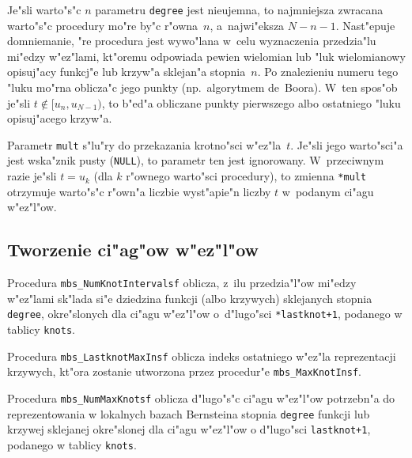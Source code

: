 Je"sli warto"s"c $n$ parametru \texttt{degree} jest nieujemna, to najmniejsza
zwracana warto"s"c procedury mo"re by"c r"owna~$n$, a~najwi"eksza $N-n-1$.
Nast"epuje domniemanie, "re procedura jest wywo"lana w~celu wyznaczenia
przedzia"lu mi"edzy w"ez"lami, kt"oremu odpowiada pewien wielomian lub "luk
wielomianowy opisuj"acy funkcj"e lub krzyw"a sklejan"a stopnia~$n$. Po
znalezieniu numeru tego "luku mo"rna oblicza"c jego punkty (np.\ algorytmem
de~Boora). W~ten spos"ob je"sli $t\notin[u_n,u_{N-1})$, to b"ed"a obliczane
punkty pierwszego albo ostatniego "luku opisuj"acego krzyw"a.

Parametr \texttt{mult} s"lu"ry do przekazania krotno"sci w"ez"la~$t$. Je"sli
jego warto"sci"a jest wska"znik pusty (\texttt{NULL}), to parametr ten jest
ignorowany. W~przeciwnym razie je"sli $t=u_k$ (dla $k$ r"ownego warto"sci
procedury), to zmienna \texttt{*mult} otrzymuje warto"s"c r"own"a liczbie
wyst"apie"n liczby $t$ w~podanym ci"agu w"ez"l"ow.



\subsection{Tworzenie ci"ag"ow w"ez"l"ow}

\hspace*{\parindent}Procedura \texttt{mbs\_NumKnotIntervalsf} oblicza,
z~ilu przedzia"l"ow mi"edzy
w"ez"lami sk"lada si"e dziedzina funkcji (albo krzywych) sklejanych stopnia
\texttt{degree}, okre"slonych dla ci"agu w"ez"l"ow o~d"lugo"sci
\texttt{*lastknot+1}, podanego w tablicy \texttt{knots}.


\vspace{\bigskipamount}
Procedura \texttt{mbs\_LastknotMaxInsf} oblicza indeks ostatniego w"ez"la
reprezentacji krzywych, kt"ora zostanie utworzona przez
procedur"e \texttt{mbs\_MaxKnotInsf}.

\vspace{\bigskipamount}
Procedura \texttt{mbs\_NumMaxKnotsf} oblicza d"lugo"s"c ci"agu w"ez"l"ow
potrzebn"a do reprezentowania w lokalnych bazach Bernsteina stopnia
\texttt{degree} funkcji lub krzywej sklejanej okre"slonej dla ci"agu
w"ez"l"ow o d"lugo"sci \texttt{lastknot+1}, podanego w tablicy
\texttt{knots}.

